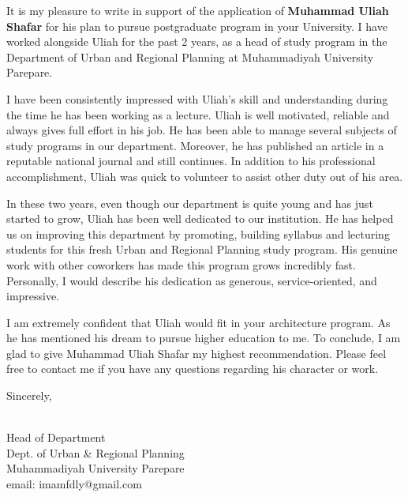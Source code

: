 \documentclass[12pt,a4paper]{lortwo}
\makeatletter
\renewcommand{\closing}[1]{
	\vspace{2.5mm} %
	\noindent %
	\hspace*{\longindentation} %
	\parbox{\indentedwidth}{
		\raggedright
		#1 %
		\vskip 1.95cm %
        \begin{spacing}{.75}

		\textbf{\fromsig} \\ %
\small Head of Department\\
\small Dept. of Urban \& Regional Planning\\
\small Muhammadiyah University Parepare\\
\small email: imamfdly@gmail.com
        \end{spacing}
	}
}
\makeatother
\begin{document}
It is my pleasure to write in support of the application of \textbf{Muhammad Uliah Shafar} for his plan to pursue postgraduate program in your University.
I have worked alongside Uliah for the past 2 years, as a head of study program in the Department of Urban and Regional Planning at Muhammadiyah University Parepare.

I have been consistently impressed with Uliah's skill and understanding during the time he has been working as a lecture.
Uliah is well motivated, reliable and always gives full effort in his job.
He has been able to manage several subjects of study programs in our department.
Moreover, he has published an article in a reputable national journal and still continues.
In addition to his professional accomplishment, Uliah was quick to volunteer to assist other duty out of his area.

In these two years, even though our department is quite young and has just started to grow, Uliah has been well dedicated to our institution.
He has helped us on improving this department by promoting, building syllabus and lecturing students for this fresh Urban and Regional Planning study program.
His genuine work with other coworkers has made this program grows incredibly fast. Personally, I would describe his dedication as generous, service-oriented, and impressive.

I am extremely confident that Uliah would fit in your architecture program. As he has mentioned his dream to pursue higher education to me. To conclude, I am glad to give Muhammad Uliah Shafar my highest recommendation. Please feel free to contact me if you have any questions regarding his character or work.

\closing{Sincerely,}

\end{document}
